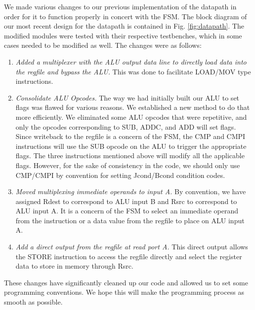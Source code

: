 \documentclass[conference]{IEEEtran}
\begin{document}
We made various changes to our previous implementation of the datapath in order for it to function properly in concert with the FSM. The block diagram of our most recent design for the datapath is contained in Fig. \ref{fig:datapath}. The modified modules were tested with their respective testbenches, which in some cases needed to be modified as well. The changes were as follows:
\begin{enumerate}
    \item \textit{Added a multiplexer with the ALU output data line to directly load data into the regfile and bypass the ALU.} This was done to facilitate LOAD/MOV type instructions. 
    \item \textit{Consolidate ALU Opcodes.} The way we had initially built our ALU to set flags was flawed for various reasons. We established a new method to do that more efficiently. We eliminated some ALU opcodes that were repetitive, and only the opcodes corresponding to SUB, ADDC, and ADD will set flags. Since writeback to the regfile is a concern of the FSM, the CMP and CMPI instructions will use the SUB opcode on the ALU to trigger the appropriate flags. The three instructions mentioned above will modify all the applicable flags. However, for the sake of consistency in the code, we should only use CMP/CMPI by convention for setting Jcond/Bcond condition codes.
    \item \textit{Moved multiplexing immediate operands to input A.} By convention, we have assigned Rdest to correspond to ALU input B and Rsrc to correspond to ALU input A. It is a concern of the FSM to select an immediate operand from the instruction or a data value from the regfile to place on ALU input A.
    \item \textit{Add a direct output from the regfile at read port A.} This direct output allows the STORE instruction to access the regfile directly and select the register data to store in memory through Rsrc.
\end{enumerate}

These changes have significantly cleaned up our code and allowed us to set some programming conventions. We hope this will make the programming process as smooth as possible. 
\end{document}
